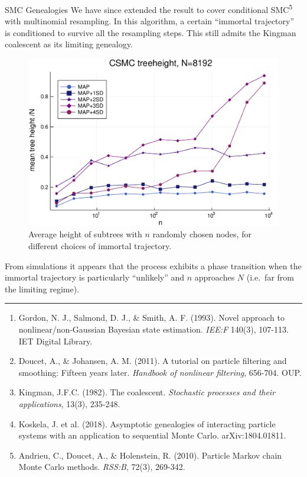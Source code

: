 \documentclass[final, 12pt]{beamer}
\newlength{\colwidth}
\begin{document}
\begin{frame}
\begin{columns}
\begin{column}{\colwidth}
\begin{block}{SMC Genealogies}
We have since extended the result to cover conditional SMC\textsuperscript{5} with multinomial resampling. In this algorithm, a certain ``immortal trajectory'' is conditioned to survive all the resampling steps. This still admits the Kingman coalescent as its limiting genealogy.\\[10pt]
\begin{figure}
\includegraphics[width=0.8\colwidth]{../CSMC_treeheight_500reps.pdf}
\caption{Average height of subtrees with $n$ randomly chosen nodes, for different choices of immortal trajectory.}
\end{figure}
From simulations it appears that the process exhibits a phase transition when the immortal trajectory is particularly ``unlikely'' and $n$ approaches $N$ (i.e.\ far from the limiting regime).
\end{block}

\vspace*{20pt}
\hrule
\begin{block}

\vspace*{-30pt}

\small{
\begin{enumerate}
\item Gordon, N. J., Salmond, D. J., \& Smith, A. F. (1993). Novel approach to nonlinear/non-Gaussian Bayesian state estimation. \textit{IEE:F} 140(3), 107-113. IET Digital Library.
\item Doucet, A., \& Johansen, A. M. (2011). A tutorial on particle filtering and smoothing: Fifteen years later. \textit{Handbook of nonlinear filtering}, 656-704. OUP.
\item Kingman, J.F.C. (1982). The coalescent. \textit{Stochastic processes and their applications}, 13(3), 235-248.
\item Koskela, J. et al. (2018).  Asymptotic genealogies of interacting particle systems with an application to sequential Monte Carlo. arXiv:1804.01811.
\item Andrieu, C., Doucet, A., \& Holenstein, R. (2010). Particle Markov chain Monte Carlo methods. \textit{RSS:B}, 72(3), 269-342.
\end{enumerate}
}
\end{block}


\end{column}
\end{columns}
\end{frame}
\end{document}
